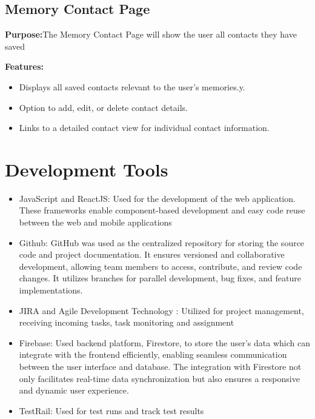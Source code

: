 \documentclass[12pt]{article}
\begin{document}
\subsection{Memory Contact Page}
\textbf{Purpose:}The Memory Contact Page will show the user all contacts they have saved

\textbf{Features:}
\begin{itemize}
     \item Displays all saved contacts relevant to the user’s memories.y.
    \item Option to add, edit, or delete contact details.
    \item Links to a detailed contact view for individual contact information.
\end{itemize}
\section{Development Tools}
\begin{itemize}
\item JavaScript and ReactJS: \newline 
Used for the development of the web application. These frameworks enable component-based development and easy code reuse between the web and mobile applications
    
 \item Github:
 GitHub was used as the centralized repository for storing the source code and project documentation. It ensures versioned and collaborative development, allowing team members to access, contribute, and review code changes. It utilizes branches for parallel development, bug fixes, and feature implementations.
    
 \item JIRA and Agile Development Technology : Utilized for project management, receiving incoming tasks, task monitoring and assignment
    
    \item Firebase:
    Used backend platform, Firestore, to store the user’s data which can integrate with the frontend efficiently, enabling seamless communication between the user interface and database. The integration with Firestore not only facilitates real-time data synchronization but also ensures a responsive and dynamic user experience.

\item TestRail: Used for test runs and track test results
    
\end{itemize}
\end{document}
